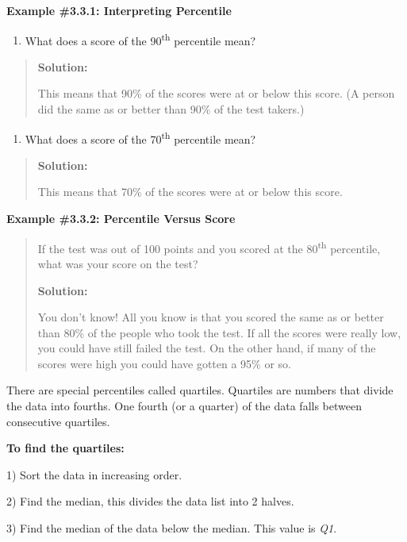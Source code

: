 \documentclass[]{book}
\providecommand{\tightlist}{%
  \setlength{\itemsep}{0pt}\setlength{\parskip}{0pt}}
\begin{document}
\textbf{Example \#3.3.1: Interpreting Percentile}

\begin{enumerate}
\def\labelenumi{\alph{enumi}.}
\tightlist
\item
  What does a score of the 90\textsuperscript{th} percentile mean?
\end{enumerate}

\begin{quote}
\textbf{Solution:}

This means that 90\% of the scores were at or below this score. (A
person did the same as or better than 90\% of the test takers.)
\end{quote}

\begin{enumerate}
\def\labelenumi{\alph{enumi}.}
\setcounter{enumi}{1}
\tightlist
\item
  What does a score of the 70\textsuperscript{th} percentile mean?
\end{enumerate}

\begin{quote}
\textbf{Solution:}

This means that 70\% of the scores were at or below this score.
\end{quote}

\textbf{Example \#3.3.2: Percentile Versus Score}

\begin{quote}
If the test was out of 100 points and you scored at the 80\textsuperscript{th}
percentile, what was your score on the test?

\textbf{Solution:}

You don't know! All you know is that you scored the same as or better
than 80\% of the people who took the test. If all the scores were
really low, you could have still failed the test. On the other hand,
if many of the scores were high you could have gotten a 95\% or so.
\end{quote}

There are special percentiles called quartiles. Quartiles are numbers
that divide the data into fourths. One fourth (or a quarter) of the data
falls between consecutive quartiles.

\textbf{To find the quartiles:}

1) Sort the data in increasing order.

2) Find the median, this divides the data list into 2 halves.

3) Find the median of the data below the median. This value is \emph{Q1}.
\end{document}
